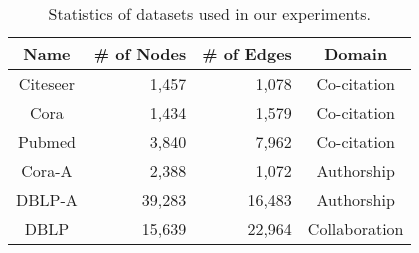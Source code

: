 \begin{table*}[t]
\centering

\caption{Statistics of datasets used in our experiments.}\label{table:datasets}
\setlength\tabcolsep{6pt} %
\def\arraystretch{1.0} %

\begin{tabular}{c|rrc}
\toprule

Name & \# of Nodes & \# of Edges & Domain \\ 

\midrule
Citeseer & 1,457 & 1,078 & Co-citation \\ 
Cora & 1,434 & 1,579 & Co-citation \\ 
Pubmed & 3,840 & 7,962 & Co-citation \\ 
Cora-A & 2,388 & 1,072 & Authorship \\ 
DBLP-A & 39,283 & 16,483 & Authorship \\ 
DBLP & 15,639 & 22,964 & Collaboration \\ 

\bottomrule
\end{tabular}
\end{table*}
